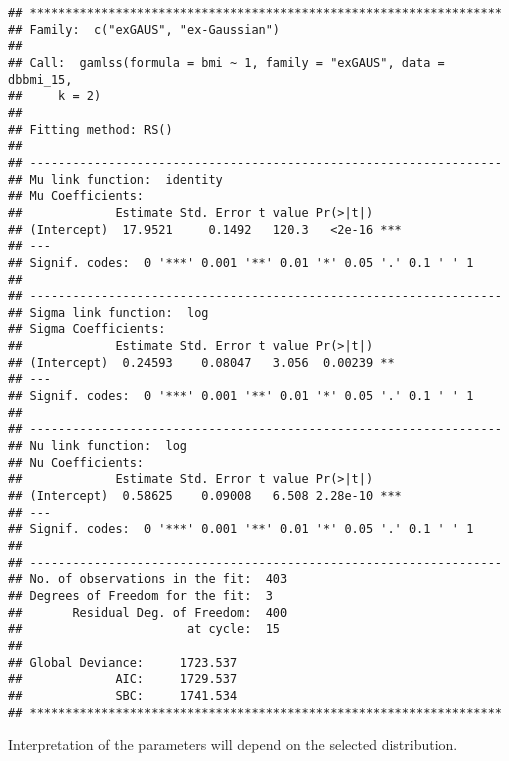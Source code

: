 \begin{verbatim}
## ******************************************************************
## Family:  c("exGAUS", "ex-Gaussian") 
## 
## Call:  gamlss(formula = bmi ~ 1, family = "exGAUS", data = dbbmi_15,  
##     k = 2) 
## 
## Fitting method: RS() 
## 
## ------------------------------------------------------------------
## Mu link function:  identity
## Mu Coefficients:
##             Estimate Std. Error t value Pr(>|t|)    
## (Intercept)  17.9521     0.1492   120.3   <2e-16 ***
## ---
## Signif. codes:  0 '***' 0.001 '**' 0.01 '*' 0.05 '.' 0.1 ' ' 1
## 
## ------------------------------------------------------------------
## Sigma link function:  log
## Sigma Coefficients:
##             Estimate Std. Error t value Pr(>|t|)   
## (Intercept)  0.24593    0.08047   3.056  0.00239 **
## ---
## Signif. codes:  0 '***' 0.001 '**' 0.01 '*' 0.05 '.' 0.1 ' ' 1
## 
## ------------------------------------------------------------------
## Nu link function:  log 
## Nu Coefficients:
##             Estimate Std. Error t value Pr(>|t|)    
## (Intercept)  0.58625    0.09008   6.508 2.28e-10 ***
## ---
## Signif. codes:  0 '***' 0.001 '**' 0.01 '*' 0.05 '.' 0.1 ' ' 1
## 
## ------------------------------------------------------------------
## No. of observations in the fit:  403 
## Degrees of Freedom for the fit:  3
##       Residual Deg. of Freedom:  400 
##                       at cycle:  15 
##  
## Global Deviance:     1723.537 
##             AIC:     1729.537 
##             SBC:     1741.534 
## ******************************************************************
\end{verbatim}

Interpretation of the parameters will depend on the selected
distribution.
